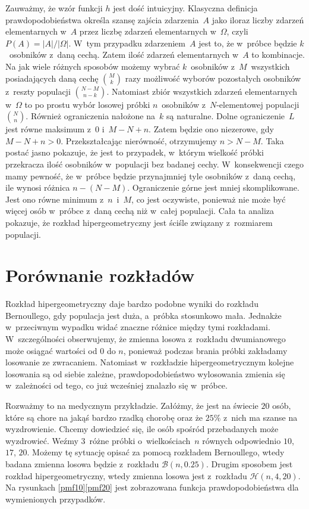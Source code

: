 Zauważmy, że wzór funkcji $h$ jest dość intuicyjny. Klasyczna definicja prawdopodobieństwa określa szansę zajścia zdarzenia~$A$ jako iloraz liczby zdarzeń elementarnych w~$A$ przez liczbę zdarzeń elementarnych w~$\Omega$, czyli $P(A) = |A|/|\Omega|$. W~tym przypadku zdarzeniem~$A$ jest to, że w~próbce będzie $k$~osobników z~daną cechą. Zatem ilość zdarzeń elementarnych w~$A$ to kombinacje. Na jak wiele różnych sposobów możemy wybrać $k$~osobników z~$M$~wszystkich posiadających daną cechę $\binom{M}{k}$ razy możliwość wyborów pozostałych osobników z~reszty populacji $\binom{N-M}{n-k}$. Natomiast zbiór wszystkich zdarzeń elementarnych w~$\Omega$ to po prostu wybór losowej próbki $n$~osobników z~$N$-elementowej populacji $\binom{N}{n}$. Również ograniczenia nałożone na~$k$ są naturalne. Dolne ograniczenie~$L$ jest równe maksimum z~$0$ i~$M-N+n$. Zatem będzie ono niezerowe, gdy $M-N+n>0$. Przekształcając nierówność, otrzymujemy $n>N-M$. Taka postać jasno pokazuje, że jest to przypadek, w~którym wielkość próbki przekracza ilość osobników w~populacji bez badanej cechy. W~konsekwencji czego mamy pewność, że w~próbce będzie przynajmniej tyle osobników z~daną cechą, ile wynosi różnica $n-(N-M)$. Ograniczenie górne jest mniej skomplikowane. Jest ono równe minimum z~$n$~i~$M$, co jest oczywiste, ponieważ nie może być więcej osób w~próbce z~daną cechą niż w~całej populacji. Cała ta analiza pokazuje, że rozkład hipergeometryczny jest ściśle związany z~rozmiarem populacji.

\section{Porównanie rozkładów}

Rozkład hipergeometryczny daje bardzo podobne wyniki do rozkładu Bernoullego, gdy populacja jest duża, a~próbka stosunkowo mała. Jednakże w~przeciwnym wypadku widać znaczne różnice między tymi rozkładami. W~szczególności obserwujemy, że zmienna losowa z~rozkładu dwumianowego może osiągać wartości od $0$ do $n$, ponieważ podczas brania próbki zakładamy losowanie ze zwracaniem. Natomiast w~rozkładzie hipergeometrycznym kolejne losowania są od siebie zależne, prawdopodobieństwo wylosowania zmienia się w~zależności od tego, co już wcześniej znalazło się w~próbce.

Rozważmy to na medycznym przykładzie. Załóżmy, że jest na świecie $20$ osób, które są chore na jakąś bardzo rzadką chorobę oraz że $25\%$ z~nich ma szanse na wyzdrowienie. Chcemy dowiedzieć się, ile osób spośród przebadanych może wyzdrowieć. Weźmy $3$~różne próbki o~wielkościach~$n$ równych odpowiednio $10$, $17$, $20$. Możemy tę sytuację opisać za pomocą rozkładem Bernoullego, wtedy badana zmienna losowa będzie z~rozkładu $\mathcal{B}(n,0.25)$. Drugim sposobem jest rozkład hipergeometryczny, wtedy zmienna losowa jest z~rozkładu $\mathcal{H}(n,4,20)$. Na rysunkach \ref{pmf10}\ppauza \ref{pmf20} jest zobrazowana funkcja prawdopodobieństwa dla wymienionych przypadków.

